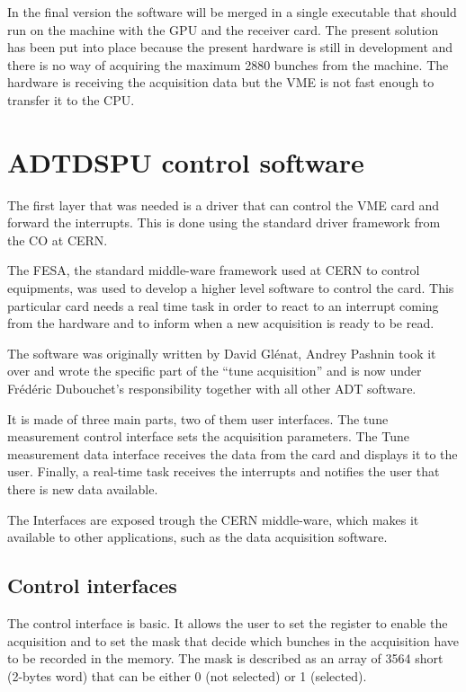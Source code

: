 In the final version the software will be merged in a single executable that should run on the machine with the \gls{GPU} and the receiver card. The present solution has been put into place because the present hardware is still in development and there is no way of acquiring the maximum 2880 bunches from the machine. The hardware is receiving the acquisition data but the \gls{VME} is not fast enough to transfer it to the \gls{CPU}.

\section{ADTDSPU control software}

The first layer that was needed is a driver that can control the \gls{VME} card and forward the interrupts. This is done using the standard driver framework from the \gls{CO} at \gls{CERN}.

The \gls{FESA}, the standard middle-ware framework used at \gls{CERN} to control equipments, was used to develop a higher level software to control the card. This particular card needs a real time task in order to react to an interrupt coming from the hardware and to inform when a new acquisition is ready to be read.

The software was originally written by David Gl{\'e}nat, Andrey Pashnin took it over and wrote the specific part of the ``tune acquisition'' and is now under Fr{\'e}d{\'e}ric Dubouchet's responsibility together with all other \gls{ADT} software.

It is made of three main parts, two of them user interfaces. The tune measurement control interface sets the acquisition parameters. The Tune measurement data interface receives the data from the card and displays it to the user. Finally, a real-time task receives the interrupts and notifies the user that there is new data available.

The Interfaces are exposed trough the \gls{CERN} middle-ware, which makes it available to other applications, such as the data acquisition software.

\subsection{Control interfaces}

The control interface is basic. It allows the user to set the register to enable the acquisition and to set the mask that decide which bunches in the acquisition have to be recorded in the memory. The mask is described as an array of 3564 short (2-bytes word) that can be either 0 (not selected) or 1 (selected).

